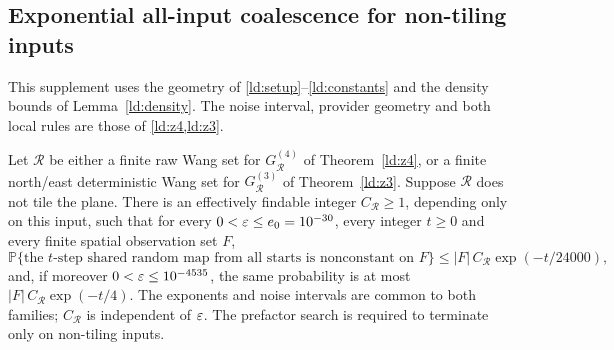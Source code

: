 \subsection{Exponential all-input coalescence for non-tiling inputs}

This supplement uses the geometry of \eqref{ld:setup}--\eqref{ld:constants} and the density
bounds of Lemma~\ref{ld:density}. The noise interval, provider geometry and both local rules are those of \cref{ld:z4,ld:z3}.
\begin{theorem}\label{ld:rate}
Let $\mathcal R$ be either a finite raw Wang set for $G^{(4)}_{\mathcal R}$ of Theorem~\ref{ld:z4}, or a finite
north/east deterministic Wang set for $G^{(3)}_{\mathcal R}$ of Theorem~\ref{ld:z3}. Suppose $\mathcal R$ does not tile
the plane. There is an effectively findable integer $C_{\mathcal R}\ge1$, depending only on this input, such that
for every $0<\varepsilon\le e_0=10^{-30}$, every integer $t\ge0$ and every finite spatial observation
set $F$,
\[
  \mathbb{P}\{\text{the $t$-step shared random map from all starts is nonconstant on }F\}
  \le|F|\,C_{\mathcal R}\exp(-t/24000),
\]
and, if moreover $0<\varepsilon\le10^{-4535}$, the same probability is at most
$|F|\,C_{\mathcal R}\exp(-t/4)$. The exponents and noise intervals are common to both families; $C_{\mathcal R}$ is
independent of $\varepsilon$. The prefactor search is required to terminate only on non-tiling
inputs.
\end{theorem}

